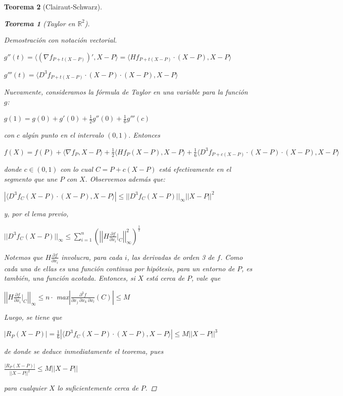 \documentclass[]{article}
\newtheorem{teo}{Teorema}
\def\R{\mathbb{R}}
\newcommand{\ip}[2]{\langle #1,#2 \rangle}
\newcommand{\dprim}[2]{\frac{\partial #1}{\partial #2}}
\newcommand{\dter}[4]{\frac{\partial^3 #1}{\partial #2\ \partial #3\ \partial #4}}
\newcommand{\zum}[2]{\sum_{#1}^{#2}}
\begin{document}
\begin{teo}[Clairaut-Schwarz]
\begin{teo}[Taylor en $\R^2$]
\begin{proof}[Demostración con notación vectorial]
\begin{center}
				$g''(t) = \ip{(\nabla f_{P+t(X-P)})'}{X-P} = \ip{Hf_{P+t(X-P)}\cdot(X-P)}{X-P}$
			\end{center}
			\begin{center}
				$g'''(t) = \ip{D^3f_{P+t(X-P)}\cdot(X-P)\cdot(X-P)}{X-P}$
			\end{center}
			Nuevamente, consideramos la fórmula de Taylor en una variable para la función $g$:
			\begin{center}
				$\displaystyle g(1) = g(0) + g'(0) + \frac{1}{2}g''(0) + \frac{1}{6}g'''(c)$
			\end{center}
			con $c$ algún punto en el intervalo $(0,1)$. Entonces
			\begin{center}
				$\displaystyle f(X) = f(P) + \ip{\nabla f_P}{X-P} + \frac{1}{2}\ip{Hf_P(X-P)}{X-P} + \frac{1}{6}\ip{D^3f_{P+c(X-P)}\cdot(X-P)\cdot(X-P)}{X-P}$
			\end{center}
			donde $c\in(0,1)$ con lo cual $C = P+c(X-P)$ está efectivamente en el segmento que une $P$ con $X$. Observemos además que:
			\begin{center}
				$|\ip{D^3f_{C}(X-P)\cdot(X-P)}{X-P}|\leq||D^3f_C(X-P)||_{\infty}||X-P||^2$
			\end{center}
			y, por el lema previo,
			\begin{center}
				$\displaystyle ||D^3f_C(X-P)||_{\infty}\leq\zum{i=1}{n}\left(\left|\left|H \dprim{f}{x_i}|_C \right|\right|^2_{\infty}\right)^{\frac{1}{2}}$
			\end{center}
			Notemos que $H\dprim{f}{x_i}$ involucra, para cada $i$, las derivadas de orden 3 de $f$. Como cada una de ellas es una función continua por hipótesis, para un entorno de $P$, es también, una función acotada. Entonces, si $X$ está cerca de $P$, vale que
			\begin{center}
				$\displaystyle \left|\left|H\dprim{f}{x_i}|_C\right|\right|_{\infty} \leq n\cdot $ max$\left|\dter{f}{x_j}{x_k}{x_l}(C)\right| \leq M$
			\end{center}
			Luego, se tiene que
			\begin{center}
				$\displaystyle |R_P(X-P)| = \frac{1}{6}|\ip{D^3f_C(X-P)\cdot(X-P)}{X-P}|\leq M||X-P||^3$
			\end{center}
			de donde se deduce inmediatamente el teorema, pues
			\begin{center}
				$\displaystyle \frac{|R_P(X-P)|}{||X-P||^2} \leq M ||X-P||$
			\end{center}
			para cualquier $X$ lo suficientemente cerca de $P$.
		\end{proof}
	\end{teo}
\end{teo}
\end{document}
